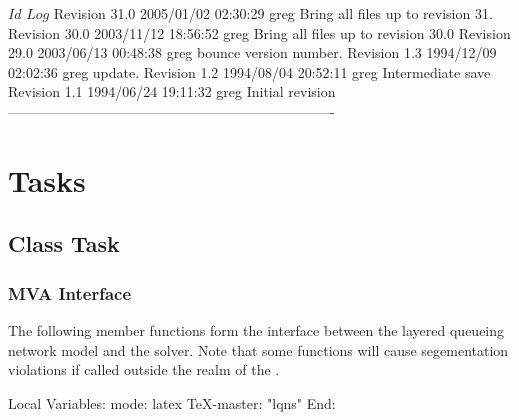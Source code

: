 \C 
\C $Id$
\C 
\C $Log$
\C Revision 31.0  2005/01/02 02:30:29  greg
\C Bring all files up to revision 31.
\C
\C Revision 30.0  2003/11/12 18:56:52  greg
\C Bring all files up to revision 30.0
\C
\C Revision 29.0  2003/06/13 00:48:38  greg
\C bounce version number.
\C
\C Revision 1.3  1994/12/09 02:02:36  greg
\C update.
\C
\C Revision 1.2  1994/08/04  20:52:11  greg
\C Intermediate save
\C
\C Revision 1.1  1994/06/24  19:11:32  greg
\C Initial revision
\C
\C ----------------------------------------------------------------------
\section{Tasks}
\label{sec:task}

\subsection{Class Task}

\label{sec:task-mva}
\subsubsection{MVA Interface}

The following member functions form the interface between the layered
queueing network model and the  solver.  Note that
some functions will cause segementation violations if called outside
the realm of the .

\label{sec:task-makeClient}
\label{sec:task-saveClientResults}

\C Local Variables: 
\C mode: latex
\C TeX-master: "lqns"
\C End: 
